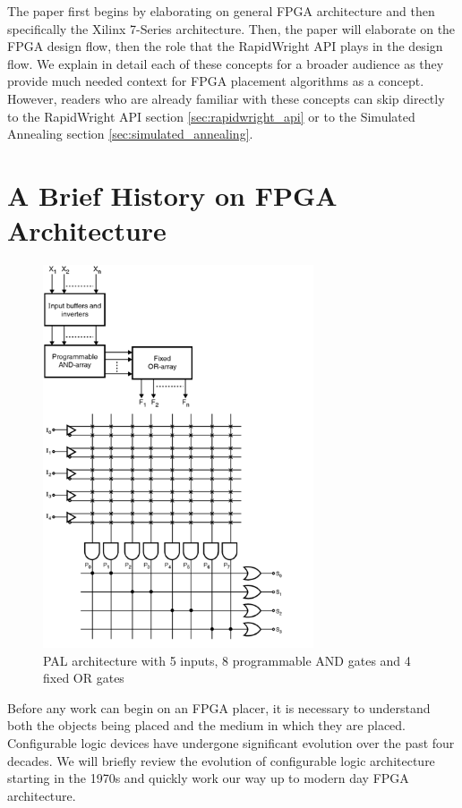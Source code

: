 \documentclass[twocolumn]{article}
\begin{document}
    The paper first begins by elaborating on general FPGA architecture and then specifically the Xilinx 7-Series architecture. 
    Then, the paper will elaborate on the FPGA design flow, then the role that the RapidWright API plays in the design flow. 
    We explain in detail each of these concepts for a broader audience as they provide much needed context for FPGA placement algorithms as a concept. 
    However, readers who are already familiar with these concepts can skip directly to the RapidWright API section \ref{sec:rapidwright_api} or to the Simulated Annealing section \ref{sec:simulated_annealing}. 



\section{A Brief History on FPGA Architecture}

    \begin{figure}
        \centering
        \includegraphics[width=8.0cm]{figures/pal_2.png}
        \caption{PAL architecture with 5 inputs, 8 programmable AND gates and 4 fixed OR gates}
        \label{fig:pla}
    \end{figure}

    Before any work can begin on an FPGA placer, it is necessary to understand both the objects being placed and the medium in which they are placed.
    Configurable logic devices have undergone significant evolution over the past four decades. 
    We will briefly review the evolution of configurable logic architecture starting in the 1970s and quickly work our way up to modern day FPGA architecture. 
    
\end{document}

